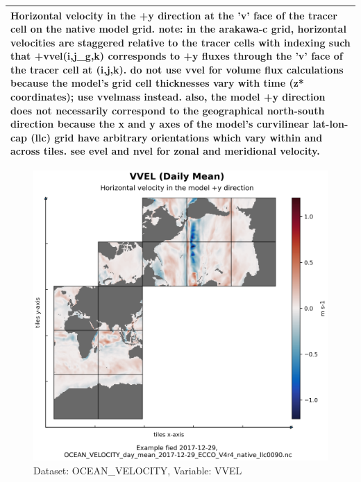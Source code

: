 \begin{longtable}{|m{}|m{}|m{}|m{}|}
\multicolumn{4}{|p{1\textwidth}|}{Horizontal velocity in the +y direction at the 'v' face of the tracer cell on the native model grid. note: in the arakawa-c grid, horizontal velocities are staggered relative to the tracer cells with indexing such that +vvel(i,j\_g,k) corresponds to +y fluxes through the 'v' face of the tracer cell at (i,j,k). do not use vvel for volume flux calculations because the model's grid cell thicknesses vary with time (z* coordinates); use vvelmass instead. also, the model +y direction does not necessarily correspond to the geographical north-south direction because the x and y axes of the model's curvilinear lat-lon-cap (llc) grid have arbitrary orientations which vary within and across tiles. see evel and nvel for zonal and meridional velocity.} \\ \hline
\end{longtable}

\begin{figure}[H]
\centering
\includegraphics[scale=0.55]{../images/plots/native_plots/Ocean_Velocity/VVEL.png}
\caption{Dataset: OCEAN\_VELOCITY, Variable: VVEL}
\label{tab:table-OCEAN_VELOCITY_VVEL-Plot}
\end{figure}
\pagebreak
